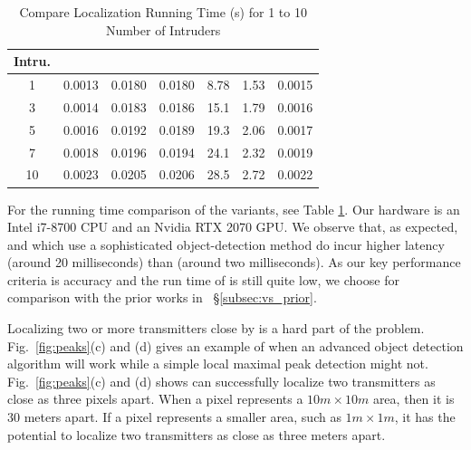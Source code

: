 \begin{table}[ht]
	\centering
	\caption{Compare Localization Running Time (s) for 1 to 10 Number of Intruders}
	\begin{tabular}{c c c c c c c}
		\hline\hline
		\small{Intru.} & \small{\ourpeak}  & \small{\ouryolo} & \small{\our} & \small{\map} & \small{\splot} & \small{\deeptx} \\
		\hline
		1 & 0.0013 & 0.0180 & 0.0180 & 8.78 & 1.53 & 0.0015 \\ 
		3 & 0.0014 & 0.0183 &  0.0186 & 15.1 & 1.79 & 0.0016 \\
		5 & 0.0016 & 0.0192 &  0.0189 & 19.3 & 2.06 & 0.0017\\
		7 & 0.0018 & 0.0196 &  0.0194 & 24.1 & 2.32 & 0.0019 \\
		10 & 0.0023 & 0.0205 & 0.0206 & 28.5 & 2.72 & 0.0022 \\
		\hline
	\end{tabular}
	\label{table:running-time}	
\end{table}


 For the running time comparison of the variants, see Table \ref{table:running-time}. 
Our hardware is an Intel i7-8700 CPU and an Nvidia RTX 2070 GPU. 
We observe that, as expected, \our and \ouryolo which use a sophisticated object-detection method do incur higher latency (around 20 milliseconds) than \ourpeak (around two milliseconds). As our key
performance criteria is accuracy and the run time of \our is still quite low, we choose \our for comparison with the prior works in ~\S\ref{subsec:vs_prior}. 


Localizing two or more transmitters close by is a hard part of the \mtl problem.
Fig.~\ref{fig:peaks}(c) and (d) gives an example of when an advanced object detection algorithm will work while a simple local maximal peak detection might not.
Fig.~\ref{fig:peaks}(c) and (d) shows \our can successfully localize two transmitters as close as three pixels apart.
When a pixel represents a $10m \times 10m$ area, then it is 30 meters apart.
If a pixel represents a smaller area, such as $1m \times 1m$, it has the potential to localize two transmitters as close as three meters apart.

